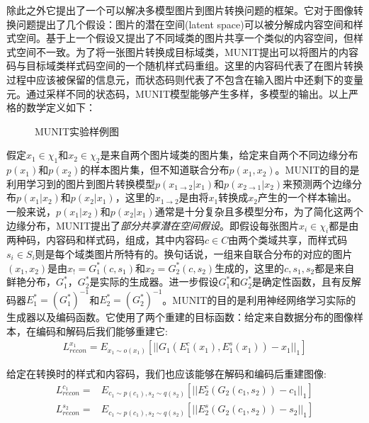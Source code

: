 除此之外它提出了一个可以解决多模型图片到图片转换问题的框架。它对于图像转换问题提出了几个假设：图片的潜在空间(latent space)可以被分解成内容空间和样式空间。基于上一个假设又提出了不同域类的图片共享一个类似的内容空间，但样式空间不一致。为了将一张图片转换成目标域类，MUNIT提出可以将图片的内容码与目标域类样式码空间的一个随机样式码重组。这里的内容码代表了在图片转换过程中应该被保留的信息元，而状态码则代表了不包含在输入图片中还剩下的变量元。通过采样不同的状态码，MUNIT模型能够产生多样，多模型的输出。以上严格的数学定义如下：

\begin{figure}[t]
    \centering
    \caption{MUNIT实验样例图}
    \label{fig:munit}
\end{figure}

假定$x_1\in \chi_1$和$x_2\in \chi_2$是来自两个图片域类的图片集，给定来自两个不同边缘分布$p(x_1)$和$p(x_2)$的样本图片集，但不知道联合分布$p(x_1, x_2)$。MUNIT的目的是利用学习到的图片到图片转换模型$p(x_{1\to 2}|x_1)$和$p(x_{2\to 1}|x_2)$来预测两个边缘分布$p(x_1|x_2)$和$p(x_2|x_1)$，这里的$x_{1\to 2}$是由将$x_1$转换成$x_2$产生的一个样本输出。一般来说，$p(x_1|x_2)$和$p(x_2|x_1)$通常是十分复杂且多模型分布，为了简化这两个边缘分布，MUNIT提出了\textit{部分共享潜在空间假设}。即假设每张图片$x_i\in \chi_i$都是由两种码，内容码和样式码，组成，其中内容码$c\in C$由两个类域共享，而样式码$s_i\in S_i$则是每个域类图片所特有的。换句话说，一组来自联合分布的对应的图片$(x_1, x_2)$是由$x_!=G_1^*(c,s_1)$和$x_2=G_2^*(c, s_2)$生成的，这里的$c,s_1,s_2$都是来自鲜艳分布，$G_1^*，G_2^*$是实际的生成器。进一步假设$G_1^*$和$G_2^*$是确定性函数，且有反解码器$E_1^*=(G_1^*)^{-1}$和$E_2^*=(G_2^*)^{-1}$。MUNIT的目的是利用神经网络学习实际的生成器以及编码函数。它使用了两个重建的目标函数：给定来自数据分布的图像样本，在编码和解码后我们能够重建它:
\begin{gather}
    L_{recon}^{x_1}=E_{x_1\sim o(x_1)}[||G_1(E_1^c(x_1), E_1^s(x_1))-x_1||_1] 
\end{gather}

给定在转换时的样式和内容码，我们也应该能够在解码和编码后重建图像:
\begin{equation}
    \begin{aligned}
        L_{recon}^{c_1}= & E_{c_1\sim p(c_1), s_2\sim q(s_2)}[||E_2^c(G_2(c_1,s_2))-c_1||_1] \\
    L_{recon}^{s_2}= & E_{c_1\sim p(c_1), s_2\sim q(s_2)}[||E_2^s(G_2(c_1, s_2))-s_2||_1]
    \end{aligned}
\end{equation}

